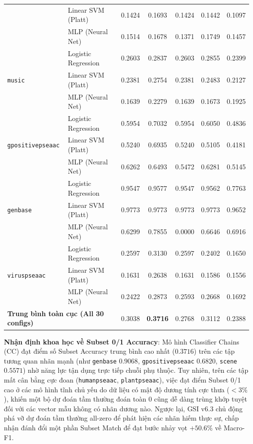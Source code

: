 \documentclass[10pt,a4paper,twoside]{article}
\begin{document}
\begin{table}[H]
{\begin{tabular}{llccccc}
 & Linear SVM (Platt) & 0.1424 & 0.1693 & 0.1424 & 0.1442 & 0.1097 \\
 & MLP (Neural Net) & 0.1514 & 0.1678 & 0.1371 & 0.1749 & 0.1457 \\
\midrule
\multirow{3}{*}{\texttt{music}} & Logistic Regression & 0.2603 & 0.2837 & 0.2603 & 0.2855 & 0.2399 \\
 & Linear SVM (Platt) & 0.2381 & 0.2754 & 0.2381 & 0.2483 & 0.2127 \\
 & MLP (Neural Net) & 0.1639 & 0.2279 & 0.1639 & 0.1673 & 0.1925 \\
\midrule
\multirow{3}{*}{\texttt{gpositivepseaac}} & Logistic Regression & 0.5954 & 0.7032 & 0.5954 & 0.6050 & 0.4836 \\
 & Linear SVM (Platt) & 0.5240 & 0.6935 & 0.5240 & 0.5105 & 0.4181 \\
 & MLP (Neural Net) & 0.6262 & 0.6493 & 0.5472 & 0.6281 & 0.5145 \\
\midrule
\multirow{3}{*}{\texttt{genbase}} & Logistic Regression & 0.9547 & 0.9577 & 0.9547 & 0.9562 & 0.7763 \\
 & Linear SVM (Platt) & 0.9773 & 0.9773 & 0.9773 & 0.9773 & 0.9652 \\
 & MLP (Neural Net) & 0.6299 & 0.7855 & 0.0000 & 0.6646 & 0.6916 \\
\midrule
\multirow{3}{*}{\texttt{viruspseaac}} & Logistic Regression & 0.2597 & 0.3130 & 0.2597 & 0.2402 & 0.1650 \\
 & Linear SVM (Platt) & 0.1631 & 0.2638 & 0.1631 & 0.1586 & 0.1556 \\
 & MLP (Neural Net) & 0.2422 & 0.2873 & 0.2593 & 0.2668 & 0.1692 \\
\midrule
\multicolumn{2}{l}{\textbf{Trung bình toàn cục (All 30 configs)}} & 0.3038 & \textbf{0.3716} & 0.2768 & 0.3112 & 0.2388 \\
\bottomrule
\end{tabular}%
}
\end{table}

\noindent\textbf{Nhận định khoa học về Subset 0/1 Accuracy}: Mô hình Classifier Chains (CC) đạt điểm số Subset Accuracy trung bình cao nhất ($0.3716$) trên các tập tương quan nhãn mạnh (như \texttt{genbase} $0.9068$, \texttt{gpositivepseaac} $0.6820$, \texttt{scene} $0.5571$) nhờ năng lực tận dụng trực tiếp chuỗi phụ thuộc. Tuy nhiên, trên các tập mất cân bằng cực đoan (\texttt{humanpseaac}, \texttt{plantpseaac}), việc đạt điểm Subset 0/1 cao ở các mô hình tĩnh chủ yếu do dữ liệu có mật độ dương tính cực thưa ($< 3\%$), khiến một bộ dự đoán tầm thường đoán toàn $0$ cũng dễ dàng trùng khớp tuyệt đối với các vector mẫu không có nhãn dương nào. Ngược lại, GSI v6.3 chủ động phá vỡ dự đoán tầm thường all-zero để phát hiện các nhãn hiếm thực sự, chấp nhận đánh đổi một phần Subset Match để đạt bước nhảy vọt $+50.6\%$ về Macro-F1.
\end{document}
